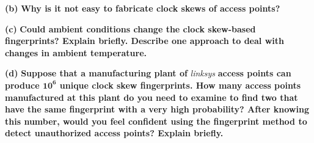 \documentclass[11pt]{article}
\renewcommand\part[1]{\vspace{.10in}\textbf{(#1)}}
\begin{document}
\part{b} \textbf{Why is it not easy to fabricate clock skews of access points?}

\part{c} \textbf{Could ambient conditions change the clock skew-based fingerprints? Explain briefly. Describe one approach to deal with changes in ambient temperature.}

\part{d} \textbf{Suppose that a manufacturing plant of} \textit{linksys} \textbf{access points can produce $\mathbf{10^6}$ unique clock skew fingerprints. How many access points manufactured at this plant do you need to examine to find two that have the same fingerprint with a very high probability? After knowing this number, would you feel confident using the fingerprint method to detect unauthorized access points? Explain briefly.}
\end{document}
